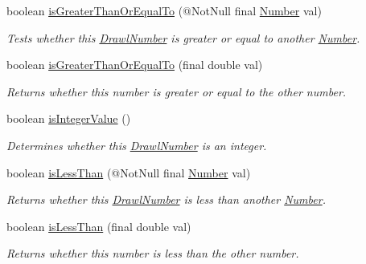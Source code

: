 \begin{DoxyCompactItemize}
boolean \hyperlink{classcom_1_1aarrelaakso_1_1drawl_1_1_drawl_number_a4818a61a5d26f43b0d5e11cb9f22551f}{is\+Greater\+Than\+Or\+Equal\+To} (@Not\+Null final \hyperlink{interfacecom_1_1aarrelaakso_1_1drawl_1_1_number}{Number} val)
\begin{DoxyCompactList}\small\item\em Tests whether this \hyperlink{classcom_1_1aarrelaakso_1_1drawl_1_1_drawl_number}{Drawl\+Number} is greater or equal to another \hyperlink{interfacecom_1_1aarrelaakso_1_1drawl_1_1_number}{Number}. \end{DoxyCompactList}\item 
boolean \hyperlink{classcom_1_1aarrelaakso_1_1drawl_1_1_drawl_number_a372a1c39c58497d16d02476d7ecd8299}{is\+Greater\+Than\+Or\+Equal\+To} (final double val)
\begin{DoxyCompactList}\small\item\em Returns whether this number is greater or equal to the other number. \end{DoxyCompactList}\item 
boolean \hyperlink{classcom_1_1aarrelaakso_1_1drawl_1_1_drawl_number_a520419e41b314adf719cfcd5939dee01}{is\+Integer\+Value} ()
\begin{DoxyCompactList}\small\item\em Determines whether this \hyperlink{classcom_1_1aarrelaakso_1_1drawl_1_1_drawl_number}{Drawl\+Number} is an integer. \end{DoxyCompactList}\item 
boolean \hyperlink{classcom_1_1aarrelaakso_1_1drawl_1_1_drawl_number_a6b5501320af37fd5aa623ed4bcbbd104}{is\+Less\+Than} (@Not\+Null final \hyperlink{interfacecom_1_1aarrelaakso_1_1drawl_1_1_number}{Number} val)
\begin{DoxyCompactList}\small\item\em Returns whether this \hyperlink{classcom_1_1aarrelaakso_1_1drawl_1_1_drawl_number}{Drawl\+Number} is less than another \hyperlink{interfacecom_1_1aarrelaakso_1_1drawl_1_1_number}{Number}. \end{DoxyCompactList}\item 
boolean \hyperlink{classcom_1_1aarrelaakso_1_1drawl_1_1_drawl_number_a01bc433270b27f6b50ea59fd0d5fcc90}{is\+Less\+Than} (final double val)
\begin{DoxyCompactList}\small\item\em Returns whether this number is less than the other number. \end{DoxyCompactList}\item 

\end{DoxyCompactItemize}
